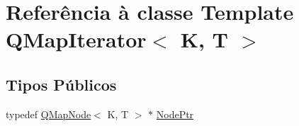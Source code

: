 \hypertarget{class_q_map_iterator}{\section{Referência à classe Template Q\-Map\-Iterator$<$ K, T $>$}
\label{class_q_map_iterator}
}
\subsection*{Tipos Públicos}
\begin{DoxyCompactItemize}
\item 
typedef \hyperlink{struct_q_map_node}{Q\-Map\-Node}$<$ K, T $>$ $\ast$ \hyperlink{class_q_map_iterator_af69493335fdffece95c987f0054ab47e}{Node\-Ptr}
\end{DoxyCompactItemize}
